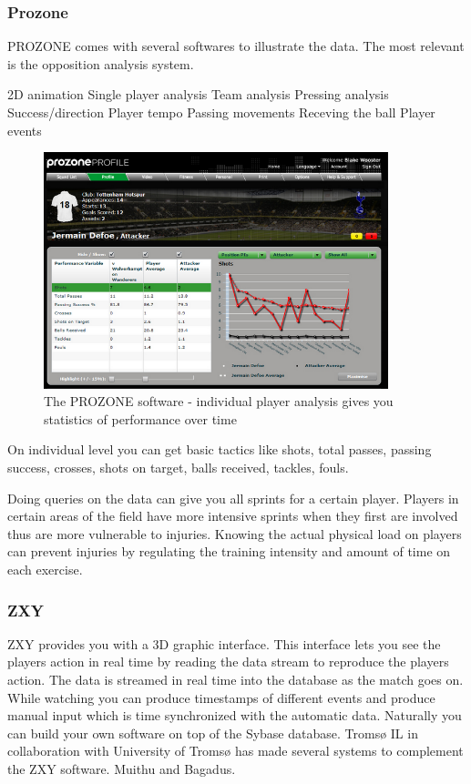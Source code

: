 \subsubsection{Prozone}


PROZONE comes with several softwares to illustrate the data. The most relevant is the opposition analysis system. 

2D animation
Single player analysis
Team analysis
Pressing analysis
Success/direction
Player tempo
Passing movements
Receving the ball
Player events

\begin{figure}[ht!]
\centering
\includegraphics[width=100mm]{images/general/prozonestats.png}
\caption{The PROZONE software - individual player analysis gives you statistics of performance over time}
\label{overflow}
\end{figure}

On individual level you can get basic tactics like shots, total passes, passing success, crosses, shots on target, balls received, tackles, fouls. 

Doing queries on the data can give you all sprints for a certain player. Players in certain areas of the field have more intensive sprints when they first are involved thus are more vulnerable to injuries. Knowing the actual physical load on players can prevent injuries by regulating the training intensity and amount of time on each exercise.

\subsubsection{ZXY}
  
ZXY provides you with a 3D graphic interface. This interface lets you see the players action in real time by reading the data stream to reproduce the players action. The data is streamed in real time into the database as the match goes on. While watching you can produce timestamps of different events and produce manual input which is time synchronized with the automatic data. Naturally you can build your own software on top of the Sybase database. Tromsø IL in collaboration with University of Tromsø has made several systems to complement the ZXY software. Muithu and Bagadus.

